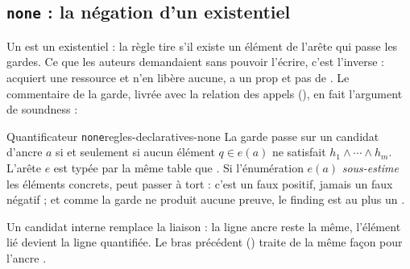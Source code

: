 \subsection{\texttt{none} : la négation d'un existentiel}

Un  est un existentiel : la règle tire s'il existe un élément de l'arête qui passe les gardes. Ce que les auteurs demandaient sans pouvoir l'écrire, c'est l'inverse : \og acquiert une ressource et n'en libère aucune\fg{}, \og a un prop  et pas de \fg{}. Le commentaire de la garde, livrée avec la relation des appels (), en fait l'argument de soundness :


\begin{definition}{Quantificateur \texttt{none}}{regles-declaratives-none}
La garde  passe sur un candidat d'ancre $a$ si et seulement si aucun élément $q \in e(a)$ ne satisfait $h_1 \wedge \cdots \wedge h_m$. L'arête $e$ est typée par la même table que . Si l'énumération $e(a)$ \emph{sous-estime} les éléments concrets,  peut passer à tort : c'est un faux positif, jamais un faux négatif ; et comme la garde ne produit aucune preuve, le finding est au plus un \Warning{}.
\end{definition}


Un candidat interne remplace la liaison : la ligne ancre reste la même, l'élément lié devient la ligne quantifiée. Le bras précédent () traite de la même façon  pour l'ancre .

